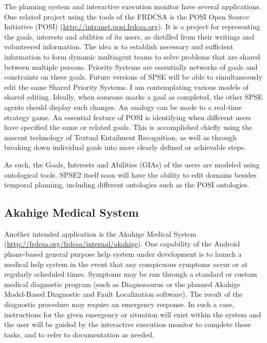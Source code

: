 \documentclass[letterpaper]{article}
\begin{document}
\noindent The planning system and interactive execution monitor have
several applications.  One related project using the tools of the
FRDCSA is the POSI Open Source Initiative (POSI)
(\url{http://intranet.posi.frdcsa.org}). It is a project for
representing the goals, interests and abilities of its users, as
distilled from their writings and volunteered information.  The idea
is to establish necessary and sufficient information to form dynamic
multiagent teams to solve problems that are shared between multiple
persons.  Priority Systems are essentially networks of goals and
constraints on these goals.  Future versions of SPSE will be able to
simultaneously edit the same Shared Priority Systems.  I am
contemplating various models of shared editing.  Ideally, when someone
marks a goal as completed, the other SPSE agents should display such
changes.  An analogy can be made to a real-time strategy game.  An
essential feature of POSI is identifying when different users have
specified the same or related goals.  This is accomplished chiefly
using the nascent technology of Textual Entailment Recognition, as
well as through breaking down individual goals into more clearly
defined or achievable steps.

As such, the Goals, Interests and Abilities (GIAs) of the users are
modeled using ontological tools.  SPSE2 itself soon will have the
ability to edit domains besides temporal planning, including different
ontologies such as the POSI ontologies.

\subsection{Akahige Medical System}
Another intended application is the Akahige Medical System
(\url{http://frdcsa.org/frdcsa/internal/akahige}).  One capability of
the Android phone-based general purpose help system under development
is to launch a medical help system in the event that any conspicuous
symptoms occur or at regularly scheduled times.  Symptoms may be run
through a standard or custom medical diagnostic program (such as
Diagnosaurus or the planned Akahige Model-Based Diagnostic and Fault
Localization software).  The result of the diagnostic procedure may
require an emergency response.  In such a case, instructions for the
given emergency or situation will exist within the system and the user
will be guided by the interactive execution monitor to complete these
tasks, and to refer to documentation as needed.
\end{document}
